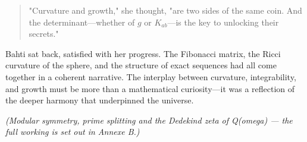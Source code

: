 \begin{quote}
"Curvature and growth," she thought, "are two sides of the same coin. And the determinant—whether of \(g\) or \(K_{ab}\)—is the key to unlocking their secrets."
\end{quote}

Bahti sat back, satisfied with her progress. The Fibonacci matrix, the Ricci curvature of the sphere, and the structure of exact sequences had all come together in a coherent narrative. The interplay between curvature, integrability, and growth must be more than a mathematical curiosity—it was a reflection of the deeper harmony that underpinned the universe.

\textit{(Modular symmetry, prime splitting and the Dedekind zeta of Q(omega) --- the full working is set out in Annexe B.)}

